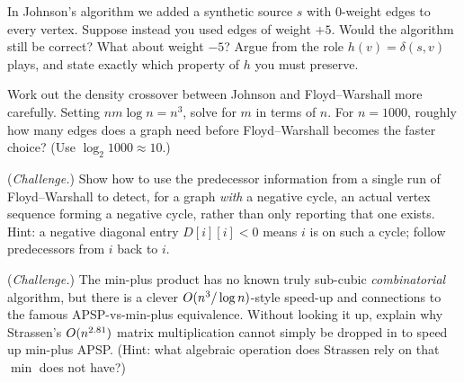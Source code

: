 \begin{exercise}
In Johnson's algorithm we added a synthetic source $s$ with $0$-weight edges to
every vertex. Suppose instead you used edges of weight $+5$. Would the algorithm
still be correct? What about weight $-5$? Argue from the role $h(v) =
\delta(s,v)$ plays, and state exactly which property of $h$ you must preserve.
\end{exercise}

\begin{exercise}
Work out the density crossover between Johnson and Floyd--Warshall more
carefully. Setting $n m \log n = n^3$, solve for $m$ in terms of $n$. For
$n = 1000$, roughly how many edges does a graph need before Floyd--Warshall
becomes the faster choice? (Use $\log_2 1000 \approx 10$.)
\end{exercise}

\begin{exercise}
(\emph{Challenge.}) Show how to use the predecessor information from a single
run of Floyd--Warshall to detect, for a graph \emph{with} a negative cycle, an
actual vertex sequence forming a negative cycle, rather than only reporting that one
exists. Hint: a negative diagonal entry $D[i][i] < 0$ means $i$ is on such a
cycle; follow predecessors from $i$ back to $i$.
\end{exercise}

\begin{exercise}
(\emph{Challenge.}) The min-plus product has no known truly sub-cubic
\emph{combinatorial} algorithm, but there is a clever $O(n^3 / \log n)$-style
speed-up and connections to the famous APSP-vs-min-plus equivalence. Without
looking it up, explain why Strassen's $O(n^{2.81})$ matrix multiplication
cannot simply be dropped in to speed up min-plus APSP. (Hint: what algebraic
operation does Strassen rely on that $\min$ does not have?)
\end{exercise}
